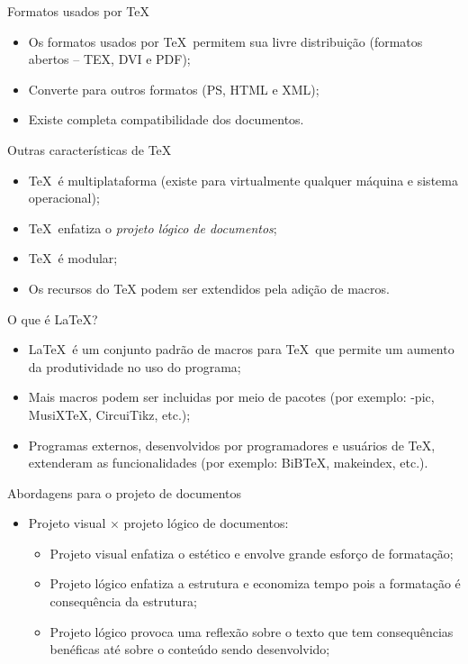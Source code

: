 \begin{frame}{Formatos usados por \TeX}
\begin{itemize}
\item Os formatos usados por \TeX\ permitem sua livre distribuição (formatos abertos -- TEX, DVI e PDF);
\item Converte para outros formatos (PS, HTML e XML);
\item Existe completa compatibilidade dos documentos.
\end{itemize}
\end{frame}

\begin{frame}{Outras características de \TeX}
\begin{itemize}
\item \TeX\ é multiplataforma (existe para virtualmente qualquer máquina e sistema operacional);
\item \TeX\ enfatiza o \emph{projeto lógico de documentos};
\item \TeX\ é modular;
\item Os recursos do \TeX{} podem ser extendidos pela adição de macros.
\end{itemize}
\end{frame}


\begin{frame}{O que é \LaTeX?}
\begin{itemize}
\item \LaTeX\ é um conjunto padrão de macros para \TeX\ que permite
  um aumento da produtividade no uso do programa;
\item Mais macros podem ser incluidas por meio de pacotes (por exemplo: \Xy-pic, MusiX\TeX, CircuiTikz, etc.);
\item Programas externos, desenvolvidos por programadores e usuários
  de \TeX, extenderam as funcionalidades (por exemplo: BiB\TeX,
  makeindex, etc.).
\end{itemize}
\end{frame}

\begin{frame}{Abordagens para o projeto de documentos}
\begin{itemize}
\item Projeto visual $\times$ projeto lógico de documentos:
\begin{itemize}
\item Projeto visual enfatiza o estético e envolve grande esforço de formatação;
\item Projeto lógico enfatiza a estrutura e economiza tempo pois a formatação é consequência da estrutura;
\item Projeto lógico provoca uma reflexão sobre o texto que tem consequências benéficas até sobre o conteúdo sendo desenvolvido;
\end{itemize}
\end{itemize}
\end{frame}

